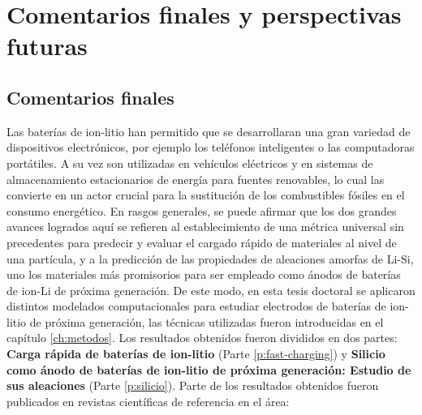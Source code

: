 \chapter{Comentarios finales y perspectivas futuras}\label{ch:comentarios}

\section{Comentarios finales}

Las baterías de ion-litio han permitido que se desarrollaran una gran variedad de
dispositivos electrónicos, por ejemplo los teléfonos inteligentes o las 
computadoras portátiles. A su vez son utilizadas en vehículos eléctricos y en 
sistemas de almacenamiento estacionarios de energía para fuentes
renovables, lo cual las convierte en un actor crucial para la sustitución de 
los combustibles fósiles en el consumo energético. En rasgos generales, se puede
afirmar que los dos grandes avances logrados aquí se refieren al establecimiento
de una métrica universal sin precedentes para predecir y evaluar el cargado rápido
de materiales al nivel de una partícula, y a la predicción de las propiedades de 
aleaciones amorfas de Li-Si, uno los materiales más promisorios para ser empleado 
como ánodos de baterías de ion-Li de próxima generación. De este modo, en esta 
tesis doctoral se 
aplicaron distintos modelados computacionales para estudiar electrodos de 
baterías de ion-litio de próxima generación, las técnicas utilizadas fueron 
introducidas en el capítulo \ref{ch:metodos}. Los resultados obtenidos fueron 
divididos en dos partes: \textbf{Carga rápida de baterías de ion-litio} (Parte 
\ref{p:fast-charging}) y \textbf{Silicio como ánodo de baterías de ion-litio de 
próxima generación: Estudio de sus aleaciones} (Parte \ref{p:silicio}). Parte de los resultados obtenidos fueron publicados en revistas científicas de referencia en el área:
